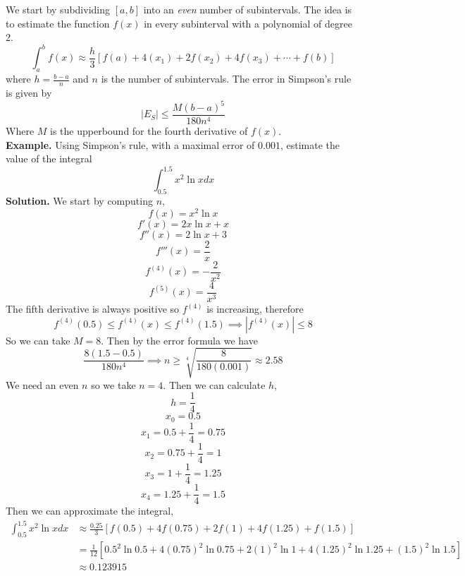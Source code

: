 \documentclass[openany]{report}
\begin{document}
We start by subdividing $[a,b]$ into an \emph{even} number of subintervals. The idea is to estimate the function $f(x)$ in every subinterval with a polynomial of degree 2. 
\[\int_a^b f(x) \approx \frac{h}{3}\left[f(a) + 4(x_1) + 2f(x_2) + 4f(x_3) + \cdots + f(b)\right]\]
where $h = \frac{b-a}{n}$ and $n$ is the number of subintervals. The error in Simpson's rule is given by
\[|E_S| \leq \frac{M(b-a)^5}{180n^4}\]
Where $M$ is the upperbound for the fourth derivative of $f(x)$.\\[2ex]
\textbf{Example.} Using Simpson's rule, with a maximal error of $0.001$, estimate the value of the integral
\[\int_{0.5}^{1.5}x^2\ln x dx\]
\textbf{Solution.} We start by computing $n$,
\[f(x) = x^2\ln x\]
\[f'(x) = 2x\ln x + x\]
\[f''(x) = 2\ln x + 3\]
\[f'''(x) = \frac{2}{x}\]
\[f^{(4)}(x) = -\frac{2}{x^2}\]
\[f^{(5)}(x) = \frac{4}{x^3}\]
The fifth derivative is always positive so $f^{(4)}$ is increasing, therefore
\[f^{(4)}(0.5) \leq f^{(4)}(x) \leq f^{(4)}(1.5) \implies |f^{(4)}(x)| \leq 8\]
So we can take $M = 8$. Then by the error formula we have
\[\frac{8(1.5-0.5)}{180n^4} \implies n \geq \sqrt[4]{\frac{8}{180(0.001)}} \approx 2.58\]
We need an even $n$ so we take $n=4$. Then we can calculate $h$,
\[h = \frac{1}{4}\]
\[x_0 = 0.5\]
\[x_1 = 0.5 + \frac{1}{4} = 0.75\]
\[x_2 = 0.75 + \frac{1}{4} = 1\]
\[x_3 = 1 + \frac{1}{4} = 1.25\]
\[x_4 = 1.25 + \frac{1}{4} = 1.5\]
Then we can approximate the integral,
\begin{align*}
    \int_{0.5}^{1.5} x^2\ln x dx &\approx \frac{0.25}{3}\left[f(0.5) + 4f(0.75) + 2f(1) + 4f(1.25) + f(1.5)\right]\\
    &= \frac{1}{12}\left[0.5^2\ln 0.5 + 4(0.75)^2\ln 0.75 + 2(1)^2\ln 1 + 4(1.25)^2\ln 1.25 + (1.5)^2\ln 1.5\right]\\
    &\approx 0.123915
\end{align*}
\end{document}
